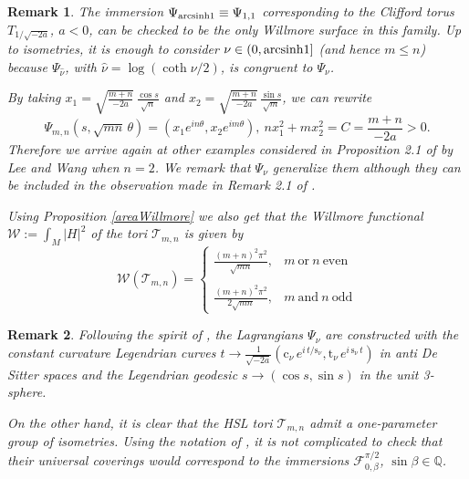 \documentclass[leqno,11pt]{amsart}
\newtheorem{remark}{Remark}
\begin{document}
\begin{remark}
{\rm The immersion $\Psi_{{\mathop{\rm arcsinh }\nolimits} 1}\equiv\Psi_{1,1}$
corresponding to the Clifford torus $T_{1/\sqrt{-2a}}$, $a<0$, can
be checked to be the only Willmore surface in this family. Up to
isometries, it is enough to consider $\nu \in (0,{\mathop{\rm arcsinh }\nolimits} 1] $
(and hence $m\leq n$) because $\Psi_{\hat \nu}$, with $ \hat{\nu}=
\log (\coth \nu/2)$, is congruent to $\Psi_\nu$.

By taking $x_1=\sqrt{\frac{m+n}{-2a}}\,\frac{\cos s}{\sqrt{n}}$
and $x_2=\sqrt{\frac{m+n}{-2a}}\,\frac{\sin s}{\sqrt{m}}$, we can
rewrite $$\Psi_{m,n}(s,\sqrt{mn}\,\theta)=( x_1 e^{in\theta},x_2
e^{i m\theta}), \ n x_1^2 + m x_2^2 = C=\frac{m+n}{-2a}>0.$$
Therefore we arrive again at other examples considered in
Proposition 2.1 of \cite{LW2} by Lee and Wang when $n=2$. We
remark that $\Psi_\nu$ generalize them although they can be
included in the observation made in Remark 2.1 of \cite{LW2}.

Using Proposition \ref{areaWillmore} we also get that the Willmore
functional $\mathcal{W}:=\int_M |H|^2 $ of the tori
$\mathcal{T}_{m,n}$ is given by
$$ \mathcal{W}(\mathcal{T}_{m,n})=\left\{ \begin{array}{ll}
\frac{(m+n)^2 \pi^2}{ \sqrt{mn}}, & m \mathrm{\ or \ } n  \mathrm{\ even} \\ \\
\frac{(m+n)^2 \pi^2}{2 \sqrt{mn}}, & m \mathrm{\ and \ } n
\mathrm{\ odd}
\end{array}\right.
$$}
\end{remark}

\begin{remark}
{\rm Following the spirit of \cite{CCh}, the Lagrangians $\Psi_\nu
$ are constructed with the constant curvature Legendrian curves
$t\rightarrow \frac{1}{\sqrt{-2a}}( \mathrm{c}_\nu\, e^{i\,t /
\mathrm{s}_\nu},\mathrm{t}_\nu \,e^{i\, \mathrm{s}_\nu \,t})$ in
anti De Sitter spaces and the Legendrian geodesic $s \rightarrow
(\cos s, \sin s)$ in the unit 3-sphere.

On the other hand, it is clear that the HSL tori
$\mathcal{T}_{m,n}$ admit a one-parameter group of isometries.
Using the notation of \cite{CU2}, it is not complicated to check
that their universal coverings would correspond to the immersions
$\mathcal{F}_{0,\beta}^{\pi/2}$, $\sin \beta \in {\mathbb{Q}}$.}
\end{remark}
\end{document}
